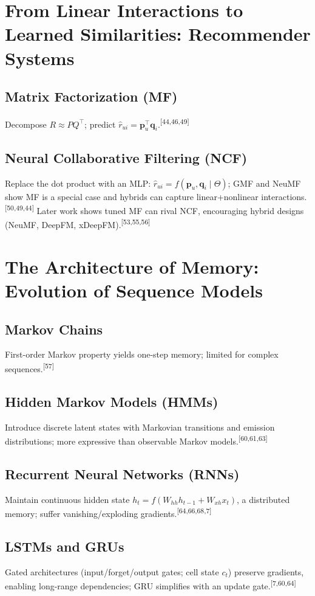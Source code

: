 \documentclass[11pt]{article}
\newcommand{\refnum}[1]{\textsuperscript{[#1]}}
\begin{document}
\section{From Linear Interactions to Learned Similarities: Recommender Systems}

\subsection{Matrix Factorization (MF)}
Decompose $R\approx P Q^\top$; predict $\hat{r}_{ui}=\mathbf{p}_u^\top\mathbf{q}_i$.\refnum{44,46,49}

\subsection{Neural Collaborative Filtering (NCF)}
Replace the dot product with an MLP: $\hat{r}_{ui}=f(\mathbf{p}_u,\mathbf{q}_i\mid\Theta)$; GMF and NeuMF show MF is a special case and hybrids can capture linear+nonlinear interactions.\refnum{50,49,44} Later work shows tuned MF can rival NCF, encouraging hybrid designs (NeuMF, DeepFM, xDeepFM).\refnum{53,55,56}

\section{The Architecture of Memory: Evolution of Sequence Models}

\subsection{Markov Chains}
First-order Markov property yields one-step memory; limited for complex sequences.\refnum{57}

\subsection{Hidden Markov Models (HMMs)}
Introduce discrete latent states with Markovian transitions and emission distributions; more expressive than observable Markov models.\refnum{60,61,63}

\subsection{Recurrent Neural Networks (RNNs)}
Maintain continuous hidden state $h_t=f(W_{hh}h_{t-1}+W_{xh}x_t)$, a distributed memory; suffer vanishing/exploding gradients.\refnum{64,66,68,7}

\subsection{LSTMs and GRUs}
Gated architectures (input/forget/output gates; cell state $c_t$) preserve gradients, enabling long-range dependencies; GRU simplifies with an update gate.\refnum{7,60,64}
\end{document}
